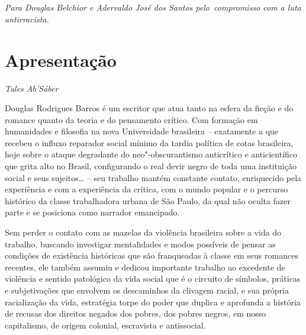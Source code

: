 \chapter*{}

\vfill
\begin{flushright}
\emph{Para Douglas Belchior e Adervaldo José dos Santos pelo~compromisso
com a luta antirracista.}
\end{flushright}
\thispagestyle{empty}

\chapter*{Apresentação}

\begin{flushright}
\emph{Tales Ab'Sáber}
\end{flushright}

Douglas Rodrigues Barros é um escritor que atua tanto na esfera da
ficção e do romance quanto da teoria e do pensamento crítico. Com
formação em humanidades e filosofia na nova Universidade brasileira --
exatamente a que recebeu o influxo reparador social mínimo da tardia
política de cotas brasileira, hoje sobre o ataque degradante do
neo"-obscurantismo anticrítico e anticientífico que grita alto no Brasil,
configurando o real devir negro de toda uma instituição social e seus
sujeitos\ldots{} -- seu trabalho mantém constante contato, enriquecido pela
experiência e com a experiência da crítica, com o mundo popular e o
percurso histórico da classe trabalhadora urbana de São Paulo, da qual
não oculta fazer parte e se posiciona como narrador emancipado.

Sem perder o contato com as mazelas da violência brasileira sobre a vida
do trabalho, buscando investigar mentalidades e modos possíveis de
pensar as condições de existência históricas que são franqueadas à
classe em seus romances recentes, ele também assumiu e dedicou
importante trabalho ao excedente de violência e sentido patológico da
vida social que é o circuito de símbolos, práticas e subjetivações que
envolvem os descaminhos da clivagem racial, e sua própria racialização
da vida, estratégia torpe do poder que duplica e aprofunda a história de
recusas dos direitos negados dos pobres, dos pobres negros, em nosso
capitalismo, de origem colonial, escravista e antissocial.

